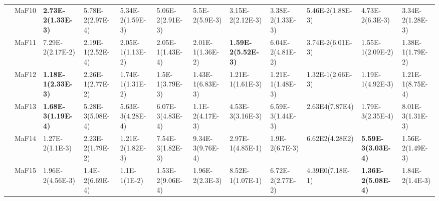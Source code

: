 \documentclass[]{article}
\begin{document}
\begin{landscape}
\begin{table}
\begin{footnotesize}
\begin{tabular}{|l|l|l|l|l|l|l|l|l|l|l|l|}
 & MaF10 & \cellcolor{gray95} {\bf 2.73E-2(1.33E-3)} & 5.78E-2(2.97E-4) & 5.34E-2(1.59E-3) & 5.06E-2(2.91E-3) & 5.5E-2(5.9E-3) & \cellcolor{gray95} 3.15E-2(2.12E-3) & \cellcolor{gray95} 3.38E-2(1.33E-3) & 5.46E-2(1.88E-3) & 4.73E-2(6.3E-3) & \cellcolor{gray95} 3.34E-2(1.28E-3)\\
 & MaF11 & \cellcolor{gray95} 7.29E-2(2.17E-2) & 2.19E-1(2.52E-4) & 2.05E-1(1.13E-2) & 2.05E-1(1.43E-4) & 2.01E-1(1.36E-2) & \cellcolor{gray95} {\bf 1.59E-2(5.52E-3)} & \cellcolor{gray95} 6.04E-2(4.81E-2) & \cellcolor{gray95} 3.74E-2(6.01E-3) & 1.55E-1(2.09E-2) & 1.38E-1(1.79E-2)\\
 & MaF12 & \cellcolor{gray95} {\bf 1.18E-1(2.33E-3)} & 2.26E-1(2.77E-2) & 1.74E-1(1.31E-2) & 1.5E-1(3.79E-3) & 1.43E-1(6.83E-3) & \cellcolor{gray95} 1.21E-1(1.61E-3) & \cellcolor{gray95} 1.21E-1(1.48E-3) & 1.32E-1(2.66E-3) & \cellcolor{gray95} 1.19E-1(4.92E-3) & \cellcolor{gray95} 1.21E-1(8.75E-4)\\
 & MaF13 & \cellcolor{gray95} {\bf 1.68E-3(1.19E-4)} & 5.28E-3(5.08E-4) & 5.63E-3(4.28E-4) & 6.07E-3(4.83E-4) & 1.1E-2(4.17E-3) & 4.53E-3(3.16E-3) & 6.59E-3(1.44E-3) & \cellcolor{gray95} 2.63E4(7.87E4) & \cellcolor{gray95} 1.79E-3(2.35E-4) & 8.01E-3(1.31E-3)\\
 & MaF14 & 1.27E-2(1.1E-3) & 2.23E-2(1.79E-2) & 1.21E-2(1.82E-3) & \cellcolor{gray95} 7.54E-3(1.82E-3) & \cellcolor{gray95} 9.34E-3(9.76E-4) & 2.97E-1(4.85E-1) & 1.9E-2(6.7E-3) & 6.62E2(4.28E2) & \cellcolor{gray95} {\bf 5.59E-3(3.03E-4)} & 1.56E-2(1.49E-3)\\
 & MaF15 & 1.96E-2(4.56E-3) & \cellcolor{gray95} 1.4E-2(6.69E-4) & 1.1E-1(1E-2) & \cellcolor{gray95} 1.53E-2(9.06E-4) & 1.96E-2(2.3E-3) & 8.52E-1(1.07E-1) & 6.72E-2(2.77E-2) & 4.39E0(7.18E-1) & \cellcolor{gray95} {\bf 1.36E-2(5.08E-4)} & 1.84E-2(1.4E-3)\\
\hline
\end{tabular}
\end{footnotesize}
\end{table}
\end{landscape}
\end{document}
